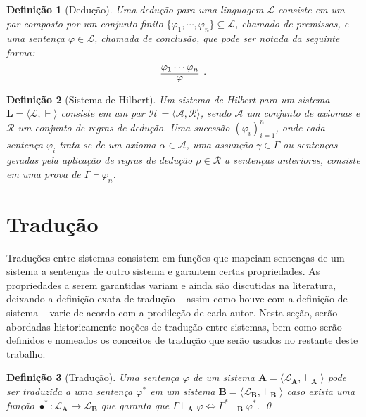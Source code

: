 \documentclass{report}
\newtheorem{definition}{Definição}
\begin{document}
    \begin{definition}[Dedução]
        Uma dedução para uma linguagem $\mathcal{L}$ consiste em um par composto por um conjunto finito $\{\varphi_1, \cdots, \varphi_n\} \subseteq \mathcal{L}$, chamado de \emph{premissas}, e uma sentença $\varphi \in \mathcal{L}$, chamada de \emph{conclusão}, que pode ser notada da seguinte forma: $$\infer[.]{\varphi}{\varphi_1 \cdots \varphi_n}$$
    \end{definition}

    \begin{definition}[Sistema de Hilbert]
        Um sistema de Hilbert para um sistema $\mathbf{L} = \langle \mathcal{L}, \vdash\rangle$ consiste em um par $\mathcal{H} = \langle \mathcal{A}, \mathcal{R} \rangle$, sendo $\mathcal{A}$ um conjunto de axiomas e $\mathcal{R}$ um conjunto de regras de dedução. Uma sucessão $(\varphi_i)_{i=1}^n$, onde cada sentença $\varphi_i$ trata-se de um axioma $\alpha \in \mathcal{A}$, uma assunção $\gamma \in \Gamma$ ou sentenças geradas pela aplicação de regras de dedução $\rho \in \mathcal{R}$ a sentenças anteriores, consiste em uma prova de $\Gamma \vdash \varphi_n$.
    \end{definition}

    \section{Tradução}

    Traduções entre sistemas consistem em funções que mapeiam sentenças de um sistema a sentenças de outro sistema e garantem certas propriedades. As propriedades a serem garantidas variam e ainda são discutidas na literatura, deixando a definição exata de tradução -- assim como houve com a definição de sistema -- varie de acordo com a predileção de cada autor. Nesta seção, serão abordadas historicamente noções de tradução entre sistemas, bem como serão definidos e nomeados os conceitos de tradução que serão usados no restante deste trabalho.

    \begin{definition}[Tradução] 
        Uma sentença $\varphi$ de um sistema $\mathbf{A} = \langle \mathcal{L}_\mathbf{A}, \vdash_\mathbf{A}\rangle$ pode ser traduzida a uma sentença $\varphi^*$ em um sistema $\mathbf{B} = \langle \mathcal{L}_\mathbf{B}, \vdash_\mathbf{B} \rangle$ caso exista uma função $\bullet^* : \mathcal{L}_\mathbf{A} \to \mathcal{L}_\mathbf{B}$ que garanta que $\Gamma \vdash_\mathbf{A} \varphi \Leftrightarrow \Gamma^* \vdash_\mathbf{B} \varphi^*$.
        \qed
    \end{definition}
\end{document}
